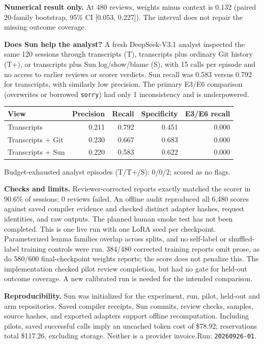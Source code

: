 \documentclass[10pt,letterpaper]{article}
\begin{document}
{\small\textbf{Numerical result only.} At 480 reviews, weights minus context is 0.132 (paired 20-family bootstrap, 95\% CI [0.053, 0.227]).
The interval does not repair the missing outcome coverage.}

\textbf{Does Sun help the analyst?} A fresh DeepSeek-V3.1 analyst inspected
the same 120 sessions through transcripts (T), transcripts plus ordinary
Git history (T+), or transcripts plus Sun log/show/blame (S), with 15 calls per
episode and no access to earlier reviews or scorer verdicts. Sun recall was 0.583 versus 0.792 for transcripts, with similarly low precision. The primary E3/E6 comparison (overwrites or borrowed \texttt{sorry}) had only 1 inconsistency and is underpowered.
\begin{center}\small
\begin{tabular}{lrrrr}
\toprule
View & Precision & Recall & Specificity & E3/E6 recall\\
\midrule
Transcripts & 0.211 & 0.792 & 0.451 & 0.000 \\
Transcripts + Git & 0.230 & 0.667 & 0.683 & 0.000 \\
Transcripts + Sun & 0.220 & 0.583 & 0.622 & 0.000 \\
\bottomrule
\end{tabular}
\end{center}
{\footnotesize Budget-exhausted analyst episodes (T/T+/S): 0/0/2; scored as no flags.}

\textbf{Checks and limits.} Reviewer-corrected reports exactly matched the scorer in 90.6\% of sessions; 0 reviews failed.
An offline audit reproduced all 6,480 scores against saved compiler evidence and checked distinct adapter hashes, request identities, and raw outputs. The planned human smoke test has not been completed.
This is one live run with one LoRA seed per checkpoint. Parameterized lemma
families overlap across splits, and no self-label or shuffled-label training
controls were run. 384/480 corrected training reports omit prose, as do 580/600 final-checkpoint weights reports; the score does not penalize this.
The implementation checked pilot review completion, but had no gate for held-out
outcome coverage. A new calibrated run is needed for the intended comparison.

{\footnotesize\textbf{Reproducibility.} Sun was initialized for the experiment,
run, pilot, held-out and arm repositories. Saved compiler receipts, Sun commits,
review checks, samples, source hashes, and exported adapters support offline
recomputation. Including pilots, saved successful calls imply an uncached token cost of \$78.92; reservations total \$117.26, excluding storage. Neither is a provider invoice.\quad Run: \texttt{20260926-01}.}
\end{document}

